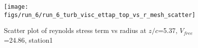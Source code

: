 \begin{figure}[H]
\centering
\texttt{[image: figs/run\_6/run\_6\_turb\_visc\_ettap\_top\_vs\_r\_mesh\_scatter]}
\caption{Scatter plot of reynolds stress term vs radius at $z/c$=5.37, $V_{free}$=24.86, station1}
\label{fig:run_6_turb_visc_ettap_top_vs_r_mesh_scatter}
\end{figure}


